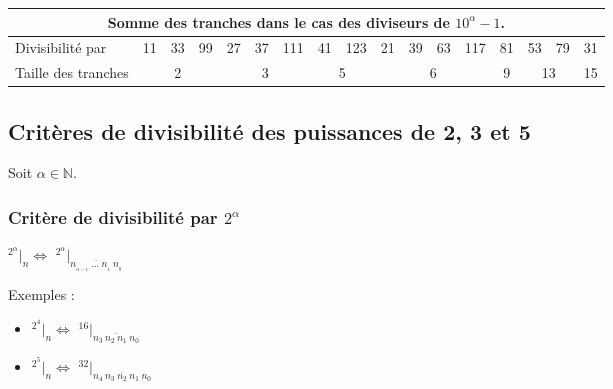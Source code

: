 \documentclass[a4paper]{article}
\begin{document}
	{ \noindent
	\begin{tabular}{|l|c|c|c|c|c|c|c|c|c|c|c|c|c|c|c|c|}
	
		\multicolumn{17}{c}{{\small \textbf{Somme des tranches dans le cas des diviseurs de {\boldmath $10^\alpha - 1$}.}}} \\
		\hline 
		
		{\normalsize Divisibilité par} & \footnotesize 11 & \footnotesize 33 & \footnotesize 99 & \footnotesize 27 & \footnotesize 37 & \footnotesize 111 & \footnotesize 41 & \footnotesize 123 & \footnotesize 21 & \footnotesize 39 & \footnotesize 63 & \footnotesize 117 & \footnotesize 81 & \footnotesize 53 & \footnotesize 79 & \footnotesize 31 \\ 
		\hline 
		Taille des tranches & \multicolumn{3}{c|}{2} & \multicolumn{3}{c|}{3} & \multicolumn{2}{c|}{5} & \multicolumn{4}{c|}{6} & 9 & \multicolumn{2}{c|}{13} & 15 \\ 
\hline 
\end{tabular} }

\pagebreak






\subsection{Critères de divisibilité des puissances de 2, 3 et 5}

Soit $\alpha \in \mathbb{N}$.

\subsubsection*{Critère de divisibilité par $2^\alpha$}

\begin{center}
	\huge
	$ ^{2^{\alpha}}|_n \Leftrightarrow$ $^{2^{\alpha}}|_{\overline{n_{_{\alpha - 1}}~\dots~n_{_1}~n_{_0}}} $
\end{center}

Exemples :

\begin{Large}
\begin{itemize}

	\item[] $ ^{2^{4}}|_n \Leftrightarrow$ $^{16}|_{\overline{n_3~n_2~n_1~n_0}} $
	\item[] $ ^{2^{5}}|_n \Leftrightarrow$ $^{32}|_{\overline{n_4~n_3~n_2~n_1~n_0}} $\\

\end{itemize}
\end{Large}
\end{document}
